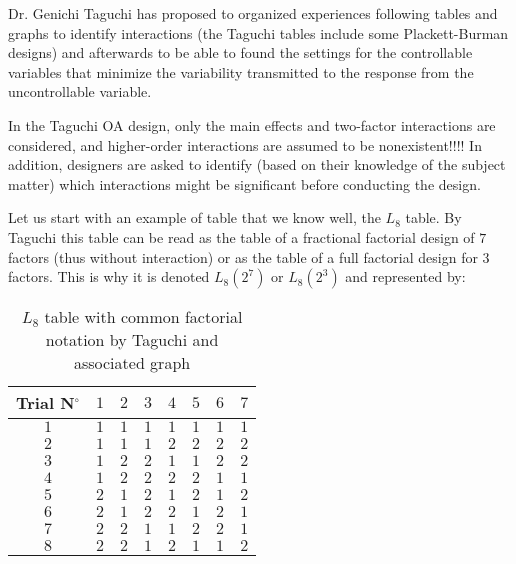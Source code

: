 	Dr. Genichi Taguchi has proposed to organized experiences following tables and graphs to identify interactions (the Taguchi tables include some Plackett-Burman designs) and afterwards to be able to found the settings for the controllable variables that minimize the variability transmitted to the response from the uncontrollable variable.
	
	In the Taguchi OA design, only the main effects and two-factor interactions are considered, and higher-order interactions are assumed to be nonexistent!!!! In addition, designers are asked to identify (based on their knowledge of the subject matter) which interactions might be significant before conducting the design.

	Let us start with an example of table that we know well, the $L_8$ table. By Taguchi this table can be read as the table of a fractional factorial design of $7$ factors (thus without interaction) or  as the table of a full factorial design for $3$ factors. This is why it is denoted $L_8(2^7)$ or $L_8(2^3)$ and represented by:
	\begin{table}[H]\centering
	\begin{center}
			\begin{tabular}{|c|c|c|c|c|c|c|c|}
				\hline
				\multicolumn{1}{c}{\cellcolor{black!30}\textbf{Trial N${}^\circ$}} & 
  \multicolumn{1}{c}{\cellcolor{black!30}$1$} & 
  \multicolumn{1}{c}{\cellcolor{black!30}$2$} & 
  \multicolumn{1}{c}{\cellcolor{black!30}$3$} & 
  \multicolumn{1}{c}{\cellcolor{black!30}$4$} & 
  \multicolumn{1}{c}{\cellcolor{black!30}$5$} & 
  \multicolumn{1}{c}{\cellcolor{black!30}$6$} & 
  \multicolumn{1}{c}{\cellcolor{black!30}$7$}\\ \hline
				 $1$ & $1$ & $1$ & $1$ & $1$ & $1$ & $1$ & $1$\\ \hline
				 $2$ & $1$ & $1$ & $1$ & $2$ & $2$ & $2$ & $2$\\ \hline
				$3$ & $1$ & $2$ & $2$ & $1$ & $1$ & $2$ & $2$\\ \hline
				$4$ & $1$ & $2$ & $2$ & $2$ & $2$ & $1$ & $1$\\ \hline
				$5$ & $2$ & $1$ & $2$ & $1$ & $2$ & $1$ & $2$\\ \hline
				$6$ & $2$ & $1$ & $2$ & $2$ & $1$ & $2$ & $1$\\ \hline
				$7$ & $2$ & $2$ & $1$ & $1$ & $2$ & $2$ & $1$\\ \hline
				$8$ & $2$ & $2$ & $1$ & $2$ & $1$ & $1$ & $2$\\ \hline
 		\end{tabular}
	\end{center}
	\caption{$L_8$ table with common factorial notation by Taguchi and associated graph}
	\end{table}

